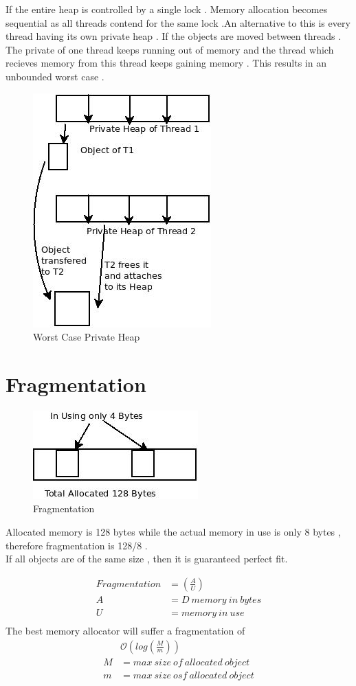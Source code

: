 \documentclass[twoside]{article}
\begin{document}
If the entire heap is controlled by a single lock . Memory allocation 
becomes sequential as all threads contend for the same lock .An alternative 
to this is every thread having its own private heap . If the objects are 
moved between threads . The private of one thread keeps running out of
memory and the thread which recieves memory from this thread keeps
gaining memory . This results in an unbounded worst case .
\begin{figure}[h]
\centering
\includegraphics[scale=.50]{Diagram2.jpeg}
\caption{Worst Case Private Heap \label{Worst Case Private Heap}}
\end{figure}

\section{Fragmentation}
\begin{figure}[h]
\centering
\includegraphics[scale=.50]{Diagram3.jpeg}
\caption{Fragmentation \label{Fragmentation}}
\end{figure}
Allocated memory is 128 bytes while the actual memory 
in use is only 8 bytes , therefore fragmentation is 128/8 .\\
If all objects are of the same size , then it is guaranteed perfect fit.

	\begin{align}
		Fragmentation&=(\frac{A}{U}) \\
		A&=D\ memory\ in\ bytes \\
		U&=memory\ in\ use	\\
	\end{align}
The best memory allocator will suffer a fragmentation of 
	\begin{align}
		&\mathcal{O}(log(\frac{M}{m})) \\
		M&=max\ size\ of\ allocated\ object	\\
		m&=max\ size\ osf\ allocated\ object	\\
	\end{align}
\end{document}
